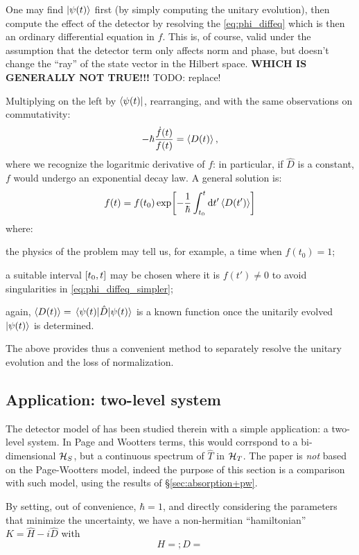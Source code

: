 One may find $\ket{\psi(t)}$ first (by simply computing the unitary evolution),
then compute the effect of the detector by resolving the \eqref{eq:phi_diffeq}
which is then an ordinary differential equation in $f$. This is, of course, valid
under the assumption that the detector term only affects norm and phase,
but doesn't change the ``ray'' of the state vector in the Hilbert space.
{\color{blue}\textbf{WHICH IS GENERALLY NOT TRUE!!!}} TODO: replace! 

Multiplying on the left by $\bra{\psi(t)}$, rearranging, and with the same observations
on commutativity:
\begin{equation}\label{eq:phi_diffeq_simpler}
  -\hbar\frac{\dot{f}(t)}{f(t)} = \ev{D(t)} \text{,}
\end{equation}
where we recognize the logaritmic derivative of $f$: in particular,
if $\hat{D}$ is a constant, $f$ would undergo an exponential decay law.
A general solution is:
\begin{equation}\label{eq:f-evol}
  f(t) = f(t_0) \exp[ -\frac{1}{\hbar} \int_{t_0}^{t} \dd{t'} \ev{D(t')} ]
\end{equation}
where:
\begin{enumerate*}[label=\emph{\alph*})]
  \item
    the physics of the problem may tell us, for example, a time when $f(t_0) = 1$;
  \item
    a suitable interval $\qty[t_0, t]$ may be chosen where it is $f(t') \ne 0$
    to avoid singularities in \eqref{eq:phi_diffeq_simpler};
  \item
    again, $\ev{D(t)} = \mel{\psi(t)}{\hat{D}}{\psi(t)}$ is a known function
    once the unitarily evolved $\ket{\psi(t)}$ is determined.
\end{enumerate*}

The above provides thus a convenient method to separately resolve
the unitary evolution and the loss of normalization.

\subsection{Application: two-level system}

The detector model of \cite{RuschhauptAbsorption} has been studied therein
with a simple application: a two-level system. In Page and Wootters terms,
this would corrspond to a bi-dimensional $\mathcal{H}_S$, but a continuous
spectrum of $\hat{T}$ in $\mathcal{H}_T$. The paper is \emph{not} based on
the Page-Wootters model, indeed the purpose of this section is a comparison
with such model, using the results of \S \ref{sec:absorption+pw}.

By setting, out of convenience, $\hbar = 1$, and directly considering the parameters
that minimize the uncertainty, we have a non-hermitian ``hamiltonian''
$K = \hat{H} - i\hat{D}$ with
\begin{equation}
  H = ; D =
\end{equation}